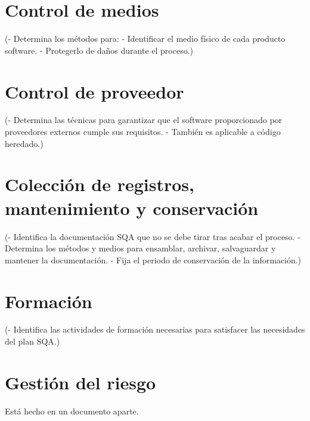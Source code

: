 \documentclass[spanish,a4paper,12pt, twoside]{report}	%
\begin{document}
\chapter{ Control de medios}
	(- Determina los métodos para:
	- Identificar el medio físico de cada producto software.
	- Protegerlo de daños durante el proceso.)

\newpage
\mbox{}
\thispagestyle{empty}						%
\newpage

\chapter{ Control de proveedor}
	(- Determina las técnicas para garantizar que el
	software proporcionado por proveedores externos
	cumple sus requisitos.
	- También es aplicable a código heredado.)

\newpage
\mbox{}
\thispagestyle{empty}						%
\newpage

\chapter{ Colección de registros, mantenimiento y conservación}
	(- Identifica la documentación SQA que no se debe
	tirar tras acabar el proceso.
	- Determina los métodos y medios para ensamblar,
	archivar, salvaguardar y mantener la documentación.
	- Fija el periodo de conservación de la información.)

\newpage
\mbox{}
\thispagestyle{empty}						%
\newpage

\chapter{ \hspace{0.25cm}Formación}
	(- Identifica las actividades de formación necesarias
	para satisfacer las necesidades del plan SQA.)

\newpage
\mbox{}
\thispagestyle{empty}						%
\newpage

\chapter{ \hspace{0.25cm}Gestión del riesgo}
	Está hecho en un documento aparte.

\end{document}

